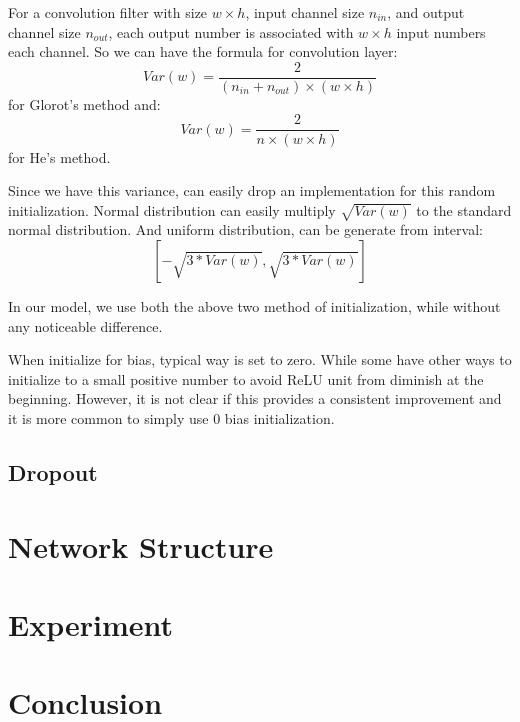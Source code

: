 \documentclass[10pt,twocolumn,letterpaper]{article}
\begin{document}
For a convolution filter with size $w\times h$, input channel size $n_{in}$, and output channel size
$n_{out}$, each output number is associated with $w\times h$ input numbers each channel. So we can have
the formula for convolution layer:
$$
Var(w) = \frac{2}{(n_{in} + n_{out}) \times (w\times h)}
$$
for Glorot's method and:
$$
Var(w) = \frac{2}{n \times (w\times h)}
$$
for He's method.

Since we have this variance, can easily drop an implementation for this random initialization. 
Normal distribution can easily multiply $\sqrt{Var(w)}$ to the standard normal distribution.
And uniform distribution, can be generate from interval:
$$
[-\sqrt{3*Var(w)}, \sqrt{3*Var(w)}]
$$

In our model, we use both the above two method of initialization, while without any noticeable
difference.

When initialize for bias, typical way is set to zero. While some have other ways\cite{krizhevsky2012imagenet}
to initialize to a small positive number to avoid ReLU unit from diminish at the beginning.
However, it is not clear if this provides a consistent improvement and it is more common to
simply use 0 bias initialization\cite{cs231nInit}.

\subsection{Dropout}

\section{Network Structure}

\section{Experiment}

\section{Conclusion}
\end{document}
